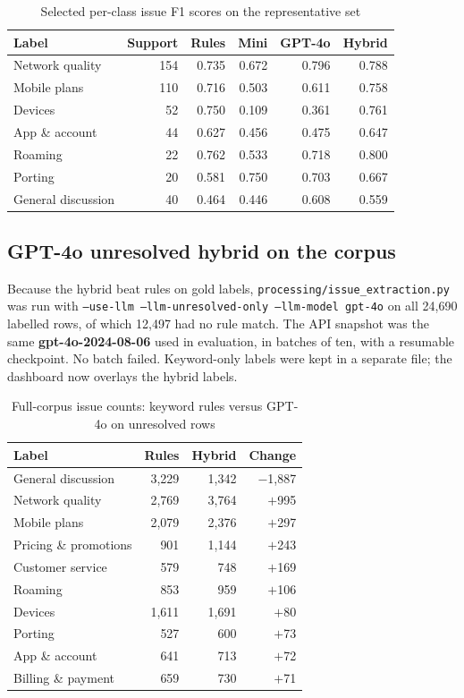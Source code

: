 \documentclass[11pt,a4paper]{article}
\begin{document}
\begin{table}[H]
\centering
\caption{Selected per-class issue F1 scores on the representative set}
\label{tab:issueclass}
\begin{tabular}{lrrrrr}
\toprule
\textbf{Label} & \textbf{Support} & \textbf{Rules} & \textbf{Mini} & \textbf{GPT-4o} & \textbf{Hybrid} \\
\midrule
Network quality & 154 & 0.735 & 0.672 & 0.796 & 0.788 \\
Mobile plans & 110 & 0.716 & 0.503 & 0.611 & 0.758 \\
Devices & 52 & 0.750 & 0.109 & 0.361 & 0.761 \\
App \& account & 44 & 0.627 & 0.456 & 0.475 & 0.647 \\
Roaming & 22 & 0.762 & 0.533 & 0.718 & 0.800 \\
Porting & 20 & 0.581 & 0.750 & 0.703 & 0.667 \\
General discussion & 40 & 0.464 & 0.446 & 0.608 & 0.559 \\
\bottomrule
\end{tabular}
\end{table}

\subsection{GPT-4o unresolved hybrid on the corpus}

Because the hybrid beat rules on gold labels, \texttt{processing/issue\_extraction.py} was run with \texttt{--use-llm --llm-unresolved-only --llm-model gpt-4o} on all 24,690 labelled rows, of which 12,497 had no rule match. The API snapshot was the same \textbf{gpt-4o-2024-08-06} used in evaluation, in batches of ten, with a resumable checkpoint. No batch failed. Keyword-only labels were kept in a separate file; the dashboard now overlays the hybrid labels.

\begin{table}[H]
\centering
\caption{Full-corpus issue counts: keyword rules versus GPT-4o on unresolved rows}
\label{tab:corpushybrid}
\begin{tabular}{lrrr}
\toprule
\textbf{Label} & \textbf{Rules} & \textbf{Hybrid} & \textbf{Change} \\
\midrule
General discussion & 3,229 & 1,342 & $-$1,887 \\
Network quality & 2,769 & 3,764 & $+$995 \\
Mobile plans & 2,079 & 2,376 & $+$297 \\
Pricing \& promotions & 901 & 1,144 & $+$243 \\
Customer service & 579 & 748 & $+$169 \\
Roaming & 853 & 959 & $+$106 \\
Devices & 1,611 & 1,691 & $+$80 \\
Porting & 527 & 600 & $+$73 \\
App \& account & 641 & 713 & $+$72 \\
Billing \& payment & 659 & 730 & $+$71 \\
\bottomrule
\end{tabular}
\end{table}
\end{document}
